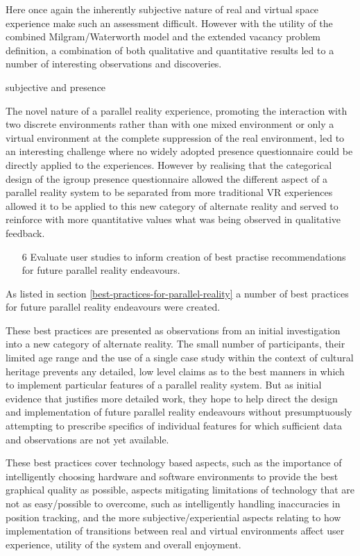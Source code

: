 Here once again the inherently subjective nature of real and virtual space experience make such an assessment difficult. However with the utility of the combined Milgram/Waterworth model and the extended vacancy problem definition, a combination of both qualitative and quantitative results led to a number of interesting observations and discoveries.

subjective and presence

The novel nature of a parallel reality experience, promoting the interaction with two discrete environments rather than with one mixed environment or only a virtual environment at the complete suppression of the real environment, led to an interesting challenge where no widely adopted presence questionnaire could be directly applied to the experiences. However by realising that the categorical design of the igroup presence questionnaire allowed the different aspect of a parallel reality system to be separated from more traditional VR experiences allowed it to be applied to this new category of alternate reality and served to reinforce with more quantitative values what was being observed in qualitative feedback.

\begin{enumerate}
	\item[6] Evaluate user studies to inform creation of best practise recommendations for future parallel reality endeavours.
\end{enumerate}

As listed in section \ref{best-practices-for-parallel-reality} a number of best practices for future parallel reality endeavours were created.

These best practices are presented as observations from an initial investigation into a new category of alternate reality. The small number of participants, their limited age range and the use of a single case study within the context of cultural heritage prevents any detailed, low level claims as to the best manners in which to implement particular features of a parallel reality system. But as initial evidence that justifies more detailed work, they hope to help direct the design and implementation of future parallel reality endeavours without presumptuously attempting to prescribe specifics of individual features for which sufficient data and observations are not yet available.

These best practices cover technology based aspects, such as the importance of intelligently choosing hardware and software environments to provide the best graphical quality as possible, aspects mitigating limitations of technology that are not as easy/possible to overcome, such as intelligently handling inaccuracies in position tracking, and the more subjective/experiential aspects relating to how implementation of transitions between real and virtual environments affect user experience, utility of the system and overall enjoyment.



